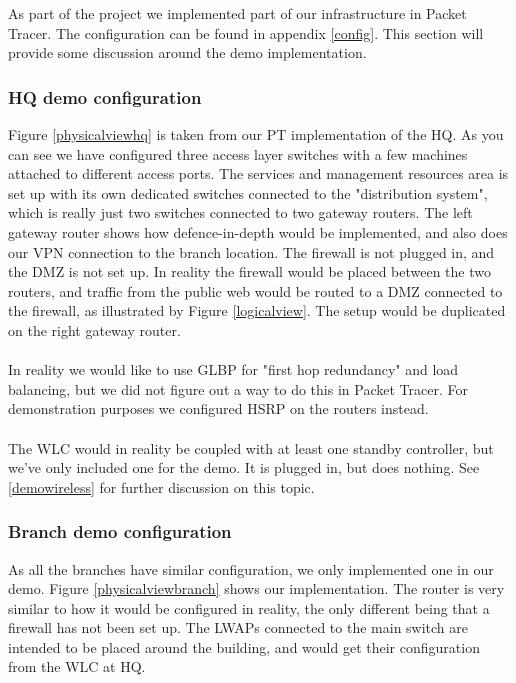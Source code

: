 As part of the project we implemented part of our infrastructure in Packet Tracer. The configuration can be found in appendix \ref{config}. This section will provide some discussion around the demo implementation.

\subsubsection{HQ demo configuration}

Figure \ref{physicalviewhq} is taken from our PT implementation of the HQ. As you can see we have configured three access layer switches with a few machines attached to different access ports. The services and management resources area is set up with its own dedicated switches connected to the "distribution system", which is really just two switches connected to two gateway routers. The left gateway router shows how defence-in-depth would be implemented, and also does our VPN connection to the branch location. The firewall is not plugged in, and the DMZ is not set up. In reality the firewall would be placed between the two routers, and traffic from the public web would be routed to a DMZ connected to the firewall, as illustrated by Figure \ref{logicalview}. The setup would be duplicated on the right gateway router.
\\
\\
In reality we would like to use GLBP for "first hop redundancy" and load balancing, but we did not figure out a way to do this in Packet Tracer. For demonstration purposes we configured HSRP on the routers instead.
\\
\\
The WLC would in reality be coupled with at least one standby controller, but we've only included one for the demo. It is plugged in, but does nothing. See \ref{demowireless} for further discussion on this topic.


\subsubsection{Branch demo configuration}

As all the branches have similar configuration, we only implemented one in our demo. Figure \ref{physicalviewbranch} shows our implementation. %
The router is very similar to how it would be configured in reality, the only different being that a firewall has not been set up. The LWAPs connected to the main switch are intended to be placed around the building, and would get their configuration from the WLC at HQ.

